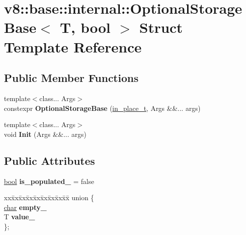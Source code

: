 \hypertarget{structv8_1_1base_1_1internal_1_1OptionalStorageBase}{}\section{v8\+:\+:base\+:\+:internal\+:\+:Optional\+Storage\+Base$<$ T, bool $>$ Struct Template Reference}
\label{structv8_1_1base_1_1internal_1_1OptionalStorageBase}
\subsection*{Public Member Functions}
\begin{DoxyCompactItemize}
\item 
\mbox{\label{structv8_1_1base_1_1internal_1_1OptionalStorageBase_afa996596076b4c072a02bb42c3ed1bcd}} 
{\footnotesize template$<$class... Args$>$ }\\constexpr {\bfseries Optional\+Storage\+Base} (\mbox{\hyperlink{structv8_1_1base_1_1in__place__t}{in\+\_\+place\+\_\+t}}, Args \&\&... args)
\item 
\mbox{\label{structv8_1_1base_1_1internal_1_1OptionalStorageBase_aa1ddb47bb5a0ce4b6e944079299bdea0}} 
{\footnotesize template$<$class... Args$>$ }\\void {\bfseries Init} (Args \&\&... args)
\end{DoxyCompactItemize}
\subsection*{Public Attributes}
\begin{DoxyCompactItemize}
\item 
\mbox{\label{structv8_1_1base_1_1internal_1_1OptionalStorageBase_a4e22aa051642b3e0072c9fe871a677dc}} 
\mbox{\hyperlink{classbool}{bool}} {\bfseries is\+\_\+populated\+\_\+} = false
\item 
\mbox{\label{structv8_1_1base_1_1internal_1_1OptionalStorageBase_a76770e1130608a136f5b30fe751bad2a}} 
\begin{tabbing}
xx\=xx\=xx\=xx\=xx\=xx\=xx\=xx\=xx\=\kill
union \{\\
\>\mbox{\hyperlink{classchar}{char}} {\bfseries empty\_}\\
\>T {\bfseries value\_}\\
\}; \\

\end{tabbing}\end{DoxyCompactItemize}


